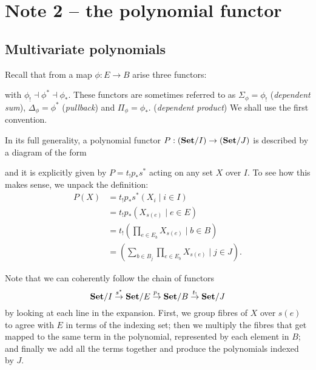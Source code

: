 
\section{Note 2 -- the polynomial functor}

\subsection{Multivariate polynomials}

Recall that from a map $\phi: E\to B$ arise three functors:
\begin{center}
\end{center}
with $\phi_! \dashv \phi^* \dashv \phi_*$. These functors are sometimes referred to as $\Sigma_\phi = \phi_!$ (\emph{dependent sum}), $\Delta_\phi = \phi^*$ (\emph{pullback}) and $\Pi_\phi = \phi_*$. (\emph{dependent product}) We shall use the first convention.

In its full generality, a polynomial functor $P:(\mathbf{Set}/I)\to(\mathbf{Set}/J)$ is described by a diagram of the form
\begin{center}
\end{center}

and it is explicitly given by $P=t_!p_*s^*$ acting on any set $X$ over $I$. To see how this makes sense, we unpack the definition:
\begin{align*}
  P(X) &= t_!p_*s^*\left( X_i \mid i\in I \right)\\
    &= t_!p_*\left( X_{s(e)} \mid e\in E \right)\\
    &= t_!\left( \prod_{e\in E_b} X_{s(e)} \mid b\in B \right)\\
    &= \left( \sum_{b\in B_j}\prod_{e\in E_b} X_{s(e)} \mid j\in J \right).
\end{align*}

Note that we can coherently follow the chain of functors
\[
  \mathbf{Set}/I \overset{s^*}{\rightarrow} \mathbf{Set}/E \overset{p_*}{\rightarrow} \mathbf{Set}/B \overset{t_!}{\rightarrow} \mathbf{Set}/J
\]
by looking at each line in the expansion. First, we group fibres of $X$ over $s(e)$ to agree with $E$ in terms of the indexing set; then we multiply the fibres that get mapped to the same term in the polynomial, represented by each element in $B$; and finally we add all the terms together and produce the polynomials indexed by $J$.

